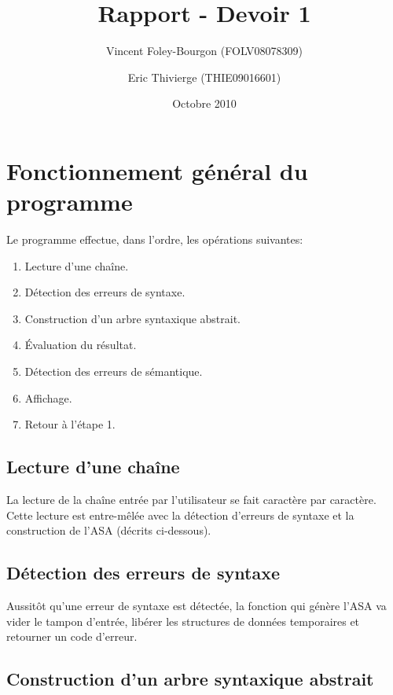 \documentclass[10pt]{report}
\begin{document}
\title{Rapport - Devoir 1}
\date{Octobre 2010}
\author{Vincent Foley-Bourgon (FOLV08078309) \and
  Eric Thivierge (THIE09016601)}

\maketitle

\section{Fonctionnement général du programme}

Le programme effectue, dans l'ordre, les opérations suivantes:

\begin{enumerate}
  \item Lecture d'une chaîne.
  \item Détection des erreurs de syntaxe.
  \item Construction d'un arbre syntaxique abstrait.
  \item Évaluation du résultat.
  \item Détection des erreurs de sémantique.
  \item Affichage.
  \item Retour à l'étape 1.
\end{enumerate}


\subsection{Lecture d'une chaîne}

La lecture de la chaîne entrée par l'utilisateur se fait caractère par
caractère.  Cette lecture est entre-mêlée avec la détection d'erreurs
de syntaxe et la construction de l'ASA (décrits ci-dessous).

\subsection{Détection des erreurs de syntaxe}

Aussitôt qu'une erreur de syntaxe est détectée, la fonction qui génère
l'ASA va vider le tampon d'entrée, libérer les structures de données
temporaires et retourner un code d'erreur.

\subsection{Construction d'un arbre syntaxique abstrait}
\end{document}
